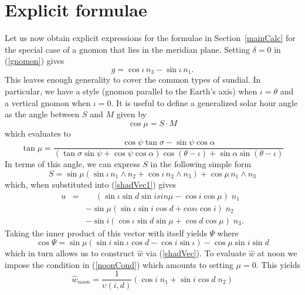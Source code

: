\documentclass[12pt]{article}
\newcommand{\nn}{\nonumber}
\newcommand{\dt}{\! \cdot \!}
\newcommand{\wdg}{\! \wedge \!}
\newcommand{\what}{\hat{w}}
\begin{document}
\section{Explicit formulae} \label{specCalc}
%
Let us now obtain explicit expressions for the formulae in Section~\ref{mainCalc} for the special case of a gnomon that lies in the meridian plane. Setting $\delta = 0$ in (\ref{gnomon}) gives
%
\begin{equation}
g = \cos\iota \, n_3 - \sin\iota \, n_1.
\end{equation}
%
This leaves enough generality to cover the common types of sundial. In particular, we have a style (gnomon parallel to the Earth's axis) when $\iota = \theta$ and a vertical gnomon when $\iota = 0$. It is useful to define a generalized solar hour angle as the angle between $S$ and $M$ given by
%
\begin{equation}
\cos\mu = S \dt M
\end{equation}
%
which evaluates to
%
\begin{equation} \label{hourAngle}
\tan\mu = \frac{\cos\psi\tan\sigma-\sin\psi\cos\alpha}{( \tan\sigma\sin\psi+\cos\psi\cos\alpha )\cos(\theta-\iota) + \sin\alpha\sin(\theta-\iota) }
\end{equation}
%
In terms of this angle, we can express $S$ in the following simple form
%
\begin{equation} \label{SBetter}
S = \sin\mu( \sin\iota \, n_1 \wdg n_2 + \cos\iota \, n_2 \wdg n_3 ) + \cos\mu \, n_1 \wdg n_3
\end{equation}
%
which, when substituted into (\ref{shadVec1}) gives
%
\begin{eqnarray} \label{shadBetter}
u & = & \phantom{-}( \sin\iota\sin d \sin i sin\mu - \cos i \cos\mu ) \; n_1 \\ \nn
& & - \sin\mu ( \sin\iota\sin i \cos d + cos\iota\cos i) \; n_2 \\ \nn
& & - \sin i (\cos\iota\sin d \sin\mu + \cos d\cos\mu) \; n_3.
\end{eqnarray}
%
Taking the inner product of this vector with itself yields $\Psi$ where
%
\begin{equation}
\cos\Psi = \sin\mu (\sin i\sin\iota\cos d - \cos i\sin\iota) - \cos\mu \sin i\sin d
\end{equation}
%
which in turn allows us to construct $\what$ via (\ref{shadVec}). To evaluate $\what$ at noon we impose the condition in (\ref{noonCond}) which amounts to setting $\mu = 0$. This yields
%
\begin{equation}
\what_{noon} = \frac{1}{\upsilon(i,d)}(\cos i \; n_1 + \sin i\cos d\; n_2)
\end{equation}
\end{document}
